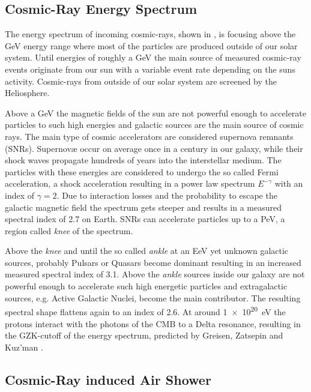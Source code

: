 \subsection{Cosmic-Ray Energy Spectrum}

The energy spectrum of incoming cosmic-rays, shown in , is focusing above the GeV energy range where most of the particles are produced outside of our solar system.
Until energies of roughly a GeV the main source of measured cosmic-ray events originate from our sun with a variable event rate depending on the suns activity.
Cosmic-rays from outside of our solar system are screened by the Heliosphere.

Above a GeV the magnetic fields of the sun are not powerful enough to accelerate particles to such high energies and galactic sources are the main source of cosmic rays.
The main type of cosmic accelerators are considered supernova remnants (SNRs).
Supernov\ae{} occur on average once in a century in our galaxy, while their shock waves propagate hundreds of years into the interstellar medium.
The particles with these energies are considered to undergo the so called Fermi acceleration, a shock acceleration resulting in a power law spectrum $E^{-\gamma}$ with an index of $\gamma = \num{2}$.
Due to interaction losses and the probability to escape the galactic magnetic field the spectrum gets steeper and results in a measured spectral index of \num{2.7} on Earth.
SNRs can accelerate particles up to a PeV, a region called \textit{knee} of the spectrum.

Above the \textit{knee} and until the so called \textit{ankle} at an EeV yet unknown galactic sources, probably Pulsars or Quasars become dominant resulting in an increased measured spectral index of \num{3.1}.
Above the \textit{ankle} sources inside our galaxy are not powerful enough to accelerate such high energetic particles and extragalactic sources, e.g. Active Galactic Nuclei, become the main contributor.
The resulting spectral shape flattens again to an index of \num{2.6}.
At around \SI{1e20}{eV} the protons interact with the photons of the CMB to a Delta resonance, resulting in the GZK-cutoff of the energy spectrum, predicted by Greisen, Zatsepin and Kuz'man \cite{Greisen66GZK, Zatsepin66GZK}.

\subsection{Cosmic-Ray induced Air Shower} \label{sec:air_shower}

